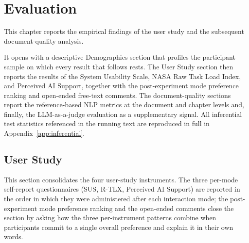 \chapter{Evaluation }
\label{ch:evaluation}

This chapter reports the empirical findings of the user study and
the subsequent document-quality analysis.

It opens with a descriptive Demographics section that profiles the participant
sample on which every result that follows rests.
The User Study section then reports the results of the
System Usability Scale, NASA Raw Task Load Index, and  Perceived AI Support,
together with the post-experiment mode preference ranking and open-ended free-text comments.
The document-quality sections report the reference-based NLP metrics at the
document and chapter levels and, finally, the LLM-as-a-judge evaluation as a supplementary signal.
All inferential test statistics referenced in the running text are reproduced in full in Appendix~\ref{app:inferential}.



\clearpage

\section{User Study}
\label{sec:eval-userstudy}

This section consolidates the four user-study instruments. The
three per-mode self-report questionnaires (SUS, R-TLX, Perceived AI
Support) are reported in the order in which they were administered
after each interaction mode; the post-experiment mode preference
ranking and the open-ended comments close the section by asking how
the three per-instrument patterns combine when participants commit
to a single overall preference and explain it in their own words.











